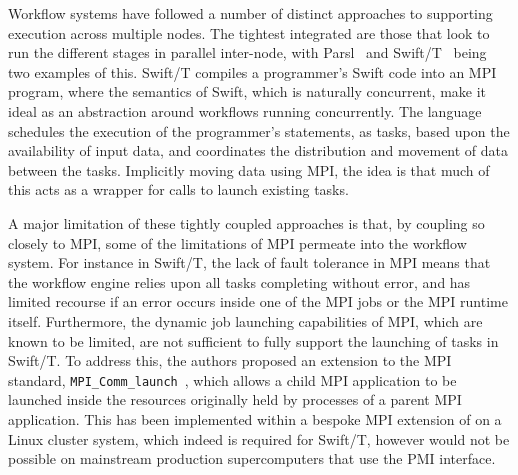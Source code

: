 \documentclass[conference]{IEEEtran}
\begin{document}
Workflow systems have followed a number of distinct approaches to supporting execution across multiple nodes. The tightest integrated are those that look to run the different stages in parallel inter-node, with Parsl~\cite{babuji2019parsl} and Swift/T~\cite{armstrong2014compiler} being two examples of this. Swift/T compiles a programmer's Swift code into an MPI program, where the semantics of Swift, which is naturally concurrent, make it ideal as an abstraction around workflows running concurrently. The language schedules the execution of the programmer's statements, as tasks, based upon the availability of input data, and coordinates the distribution and movement of data between the tasks. Implicitly moving data using MPI, the idea is that much of this acts as a wrapper for calls to launch existing tasks.

A major limitation of these tightly coupled approaches is that, by coupling so closely to MPI, some of the limitations of MPI permeate into the workflow system. For instance in Swift/T, the lack of fault tolerance in MPI means that the workflow engine relies upon all tasks completing without error, and has limited recourse if an error occurs inside one of the MPI jobs or the MPI runtime itself. Furthermore, the dynamic job launching capabilities of MPI, which are known to be limited, are not sufficient to fully support the launching of tasks in Swift/T. To address this, the authors proposed an extension to the MPI standard, \texttt{MPI_Comm_launch}~\cite{wozniak2019mpi}, which allows a child MPI application to be launched inside the resources originally held by processes of a parent MPI application. This has been implemented within a bespoke MPI extension of on a Linux cluster system, which indeed is required for Swift/T, however would not be possible on mainstream production supercomputers that use the PMI interface.
\end{document}
